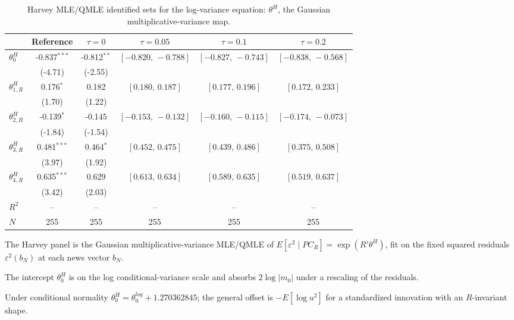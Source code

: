 \documentclass[11pt]{article}
\begin{document}
\begin{table}[!htbp]
\centering
\begin{threeparttable}
\caption{Harvey MLE/QMLE identified sets for the log-variance equation: $\theta^{H}$, the Gaussian multiplicative-variance map.}
\label{tab:log_var_eq_harvey}
\footnotesize\setlength{\tabcolsep}{3pt}
\begin{tabular}{lccccc}
\toprule
 & Reference & $\tau{=}0$ & $\tau{=}0.05$ & $\tau{=}0.1$ & $\tau{=}0.2$ \\
\midrule
$\theta^{H}_0$ & -0.837$^{***}$ & -0.812$^{**}$ & $[-0.820,\,-0.788]$ & $[-0.827,\,-0.743]$ & $[-0.838,\,-0.568]$ \\
 & (-4.71) & (-2.55) &  &  &  \\
\midrule
$\theta^{H}_{1,R}$ & 0.176$^{*}$ & 0.182 & $[0.180,\,0.187]$ & $[0.177,\,0.196]$ & $[0.172,\,0.233]$ \\
 & (1.70) & (1.22) &  &  &  \\
$\theta^{H}_{2,R}$ & -0.139$^{*}$ & -0.145 & $[-0.153,\,-0.132]$ & $[-0.160,\,-0.115]$ & $[-0.174,\,-0.073]$ \\
 & (-1.84) & (-1.54) &  &  &  \\
$\theta^{H}_{3,R}$ & 0.481$^{***}$ & 0.464$^{*}$ & $[0.452,\,0.475]$ & $[0.439,\,0.486]$ & $[0.375,\,0.508]$ \\
 & (3.97) & (1.92) &  &  &  \\
$\theta^{H}_{4,R}$ & 0.635$^{***}$ & 0.629 & $[0.613,\,0.634]$ & $[0.589,\,0.635]$ & $[0.519,\,0.637]$ \\
 & (3.42) & (2.03) &  &  &  \\
$R^2$ & -- & -- & -- & -- & -- \\
$N$ & 255 & 255 & 255 & 255 & 255 \\
\bottomrule
\end{tabular}
\begin{tablenotes}[flushleft]
\scriptsize
\item The Harvey panel is the Gaussian multiplicative-variance MLE/QMLE of $E[\varepsilon^2 \mid PC_R] = \exp(R'\theta^{H})$, fit on the fixed squared residuals $\varepsilon^2(b_N)$ at each news vector $b_N$.
\item The intercept $\theta^{H}_0$ is on the log conditional-variance scale and absorbs $2\log|m_0|$ under a rescaling of the residuals.
\item Under conditional normality $\theta^{H}_0 = \theta^{log}_0 + 1.270362845$; the general offset is $-E[\log u^2]$ for a standardized innovation with an $R$-invariant shape.

\end{tablenotes}
\end{threeparttable}
\end{table}
\end{document}
